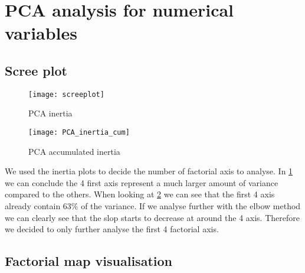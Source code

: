 

\section{PCA analysis for numerical variables}%
\label{sec:pca_analysis_for_numerical_variables}

\subsection{Scree plot}%
\label{sub:scree_plot}


\begin{figure}[H]
    \centering
    \texttt{[image: screeplot]} %
    \caption{PCA inertia}%
    \label{fig:pca_inertia}
\end{figure}

\begin{figure}[H]
    \centering
    \texttt{[image: PCA\_inertia\_cum]}
    \caption{PCA accumulated inertia}%
    \label{fig:pca_inertia_cum}
\end{figure}

We used the inertia plots to decide the number of factorial axis to analyse. In
\cref{fig:pca_inertia} we can conclude the 4 first axis represent a much
larger amount of variance compared to the others. When looking at
\cref{fig:pca_inertia_cum} we can see that the first 4 axis already contain 63\%
of the variance. If we analyse further with the elbow method we can clearly see
that the slop starts to decrease at around the 4 axis. Therefore we decided to
only further analyse the first 4 factorial axis.



\subsection{Factorial map visualisation}%
\label{sub:factorial_map_visualisation}

\newcommand{\factorialmap}[2]{
    \begin{figure}[H]
        \centering
        \texttt{[image: plane\_\#1\_\#2-var]}
        \caption{PCA plane #1 vs #2}%
        \label{fig:plane_#1-#2}
    \end{figure}
}

